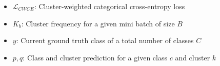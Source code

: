 \documentclass[portrait,a0paper,fontscale=0.292]{baposter}
\begin{document}
\begin{poster}
{\begin{minipage}[t]{0.5\textwidth}
    \begin{itemize}
        \item $\mathcal{L}_{CWCE}$: Cluster-weighted categorical cross-entropy loss
        \item $K_b$: Cluster frequency for a given mini batch of size $B$
        \item $y$: Current ground truth class of a total number of classes $C$
        \item $p, q$: Class and cluster prediction for a given class $c$ and cluster $k$
    \end{itemize}
    
\end{minipage}
}

\end{poster}
\end{document}
